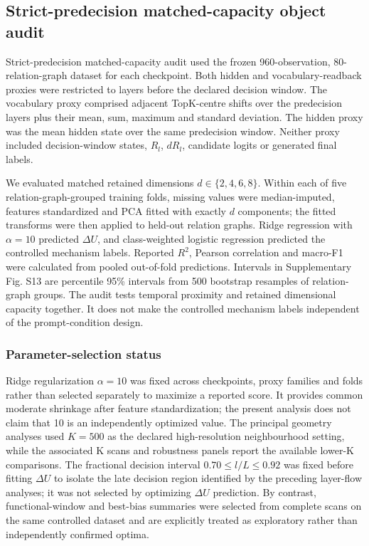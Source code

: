 \documentclass[11pt]{article}
\begin{document}
\subsection*{Strict-predecision matched-capacity object audit}
Strict-predecision matched-capacity audit used the frozen 960-observation, 80-relation-graph dataset for each checkpoint. Both hidden and vocabulary-readback proxies were restricted to layers before the declared decision window. The vocabulary proxy comprised adjacent TopK-centre shifts over the predecision layers plus their mean, sum, maximum and standard deviation. The hidden proxy was the mean hidden state over the same predecision window. Neither proxy included decision-window states, \(R_l\), \(dR_l\), candidate logits or generated final labels.

We evaluated matched retained dimensions \(d\in\{2,4,6,8\}\). Within each of five relation-graph-grouped training folds, missing values were median-imputed, features standardized and PCA fitted with exactly \(d\) components; the fitted transforms were then applied to held-out relation graphs. Ridge regression with \(\alpha=10\) predicted \(\Delta U\), and class-weighted logistic regression predicted the controlled mechanism labels. Reported \(R^2\), Pearson correlation and macro-F1 were calculated from pooled out-of-fold predictions. Intervals in Supplementary Fig. S13 are percentile 95\% intervals from 500 bootstrap resamples of relation-graph groups. The audit tests temporal proximity and retained dimensional capacity together. It does not make the controlled mechanism labels independent of the prompt-condition design.

\subsubsection*{Parameter-selection status}
Ridge regularization \(\alpha=10\) was fixed across checkpoints, proxy families and folds rather than selected separately to maximize a reported score. It provides common moderate shrinkage after feature standardization; the present analysis does not claim that 10 is an independently optimized value. The principal geometry analyses used \(K=500\) as the declared high-resolution neighbourhood setting, while the associated K scans and robustness panels report the available lower-K comparisons. The fractional decision interval \(0.70\leq l/L\leq0.92\) was fixed before fitting \(\Delta U\) to isolate the late decision region identified by the preceding layer-flow analyses; it was not selected by optimizing \(\Delta U\) prediction. By contrast, functional-window and best-bias summaries were selected from complete scans on the same controlled dataset and are explicitly treated as exploratory rather than independently confirmed optima.
\end{document}
